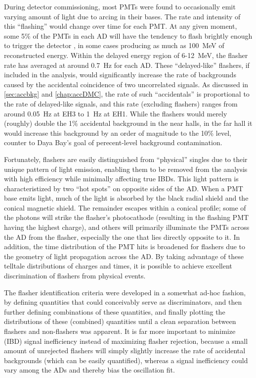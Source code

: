 \documentclass[../thesis.tex]{subfiles}
\begin{document}
During detector commissioning, most PMTs were found to occasionally emit varying amount of light due to arcing in their bases. The rate and intensity of this ``flashing'' would change over time for each PMT. At any given moment, some 5\% of the PMTs in each AD will have the tendency to flash brightly enough to trigger the detector \cite{SideBySide}, in some cases producing as much as 100~MeV of reconstructed energy. Within the delayed energy region of 6-12~MeV, the flasher rate has averaged at around 0.7~Hz for each AD. These ``delayed-like'' flashers, if included in the analysis, would significantly increase the rate of backgrounds caused by the accidental coincidence of two uncorrelated signals. As discussed in \autoref{sec:accbkg} and \autoref{chap:accDMC}, the rate of such ``accidentals'' is proportional to the rate of delayed-like signals, and this rate (excluding flashers) ranges from around 0.05~Hz at EH3 to 1~Hz at EH1. While the flashers would merely (roughly) double the 1\% accidental background in the near halls, in the far hall it would increase this background by an order of magnitude to the 10\% level, counter to Daya Bay's goal of perecent-level background contamination.

Fortunately, flashers are easily distinguished from ``physical'' singles due to their unique pattern of light emission, enabling them to be removed from the analysis with high efficiency while minimally affecting true IBDs. This light pattern is characteristized by two ``hot spots'' on opposite sides of the AD. When a PMT base emits light, much of the light is absorbed by the black radial shield and the conical magnetic shield. The remainder escapes within a conical profile; some of the photons will strike the flasher's photocathode (resulting in the flashing PMT having the highest charge), and others will primarily illuminate the PMTs across the AD from the flasher, especially the one that lies directly opposite to it. In addition, the time distribution of the PMT hits is broadened for flashers due to the geometry of light propagation across the AD. By taking advantage of these telltale distributions of charges and times, it is possible to achieve excellent discrimination of flashers from physical events.

The flasher identification criteria were developed in a somewhat ad-hoc fashion, by defining quantities that could conceivably serve as discriminators, and then further defining combinations of these quantities, and finally plotting the distributions of these (combined) quantities until a clean separation between flashers and non-flashers was apparent. It is far more important to minimize (IBD) signal inefficiency instead of maximizing flasher rejection, because a small amount of unrejected flashers will simply slightly increase the rate of accidental backgrounds (which can be easily quantified), whereas a signal inefficiency could vary among the ADs and thereby bias the oscillation fit.
\end{document}
